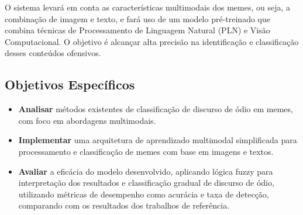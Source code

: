 O sistema levará em conta as características multimodais dos memes, ou seja, a combinação de imagem e texto, e fará uso de um modelo pré-treinado que combina técnicas de Processamento de Linguagem Natural (PLN) e Visão Computacional. O objetivo é alcançar alta precisão na identificação e classificação desses conteúdos ofensivos.

\subsection{Objetivos Específicos}

\begin{itemize}
    \item \textbf{Analisar} métodos existentes de classificação de discurso de ódio em memes, com foco em abordagens multimodais.
    \item \textbf{Implementar} uma arquitetura de aprendizado multimodal simplificada para processamento e classificação de memes com base em imagens e textos.
    \item \textbf{Avaliar} a eficácia do modelo desenvolvido, aplicando lógica fuzzy para interpretação dos resultados e classificação gradual de discurso de ódio, utilizando métricas de desempenho como acurácia e taxa de detecção, comparando com os resultados dos trabalhos de referência.
\end{itemize}





